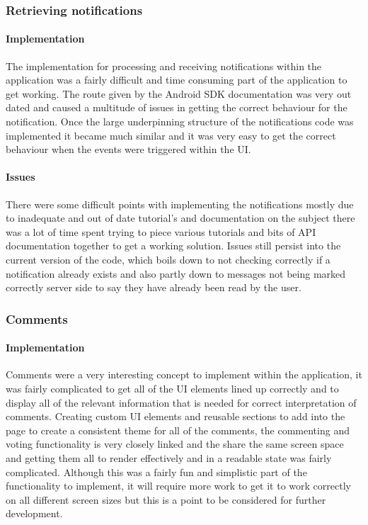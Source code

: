 \subsubsection*{Retrieving notifications}

\paragraph*{Implementation}

The implementation for processing and receiving notifications within the application was a fairly difficult and time consuming part of the application to get working. The route given by the Android SDK documentation was very out dated and caused a multitude of issues in getting the correct behaviour for the notification. Once the large underpinning structure of the notifications code was implemented it became much similar and it was very easy to get the correct behaviour when the events were triggered within the UI.

\paragraph*{Issues}

There were some difficult points with implementing the notifications mostly due to inadequate and out of date tutorial's and documentation on the subject there was a lot of time spent trying to piece various tutorials and bits of API documentation together to get a working solution. Issues still persist into the current version of the code, which boils down to not checking correctly if a notification already exists and also partly down to messages not being marked correctly server side to say they have already been read by the user.

\subsubsection*{Comments}

\paragraph*{Implementation}

Comments were a very interesting concept to implement within the application, it was fairly complicated to get all of the UI elements lined up correctly and to display all of the relevant information that is needed for correct interpretation of comments. Creating custom UI elements and reusable sections to add into the page to create a consistent theme for all of the comments, the commenting and voting functionality is very closely linked and the share the same screen space and getting them all to render effectively and in a readable state was fairly complicated. Although this was a fairly fun and simplistic part of the functionality to implement, it will require more work to get it to work correctly on all different screen sizes but this is a point to be considered for further development.


